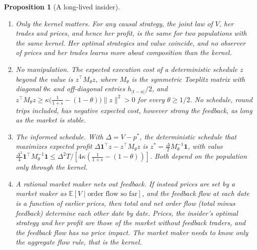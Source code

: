 \documentclass[12pt]{article}
\newtheorem{proposition}[theorem]{Proposition}
\theoremstyle{definition}
\theoremstyle{remark}
\begin{document}
\begin{proposition}[A long-lived insider]\label{prop:insider}
\begin{enumerate}[label=(\roman*),itemsep=1pt]
\item \emph{Only the kernel matters.} For any causal strategy, the joint law of $V$, her trades and prices, and hence her profit, is the same for two populations with the same kernel. Her optimal strategies and value coincide, and no observer of prices and her trades learns more about composition than the kernel.
\item \emph{No manipulation.} The expected execution cost of a deterministic schedule $z$ beyond the value is $z^\top M_\theta z$, where $M_\theta$ is the symmetric Toeplitz matrix with diagonal $\theta\kappa$ and off-diagonal entries $h_{|t-u|}/2$, and $z^\top M_\theta z\ge\kappa\bigl(\frac1{1+s}-(1-\theta)\bigr)\|z\|^2>0$ for every $\theta\ge1/2$. No schedule, round trips included, has negative expected cost, however strong the feedback, as long as the market is stable.
\item \emph{The informed schedule.} With $\Delta=V-p^*$, the deterministic schedule that maximizes expected profit $\Delta\mathbf 1^\top z-z^\top M_\theta z$ is $z^*=\frac\Delta2M_\theta^{-1}\mathbf 1$, with value $\frac{\Delta^2}4\mathbf 1^\top M_\theta^{-1}\mathbf 1\le\Delta^2T/[4\kappa(\frac1{1+s}-(1-\theta))]$. Both depend on the population only through the kernel.
\item \emph{A rational market maker nets out feedback.} If instead prices are set by a market maker as $\mathbb E[V\mid\text{order flow so far}]$, and the feedback flow at each date is a function of earlier prices, then total and net order flow (total minus feedback) determine each other date by date. Prices, the insider's optimal strategy and her profit are those of the market without feedback traders, and the feedback flow has no price impact. The market maker needs to know only the aggregate flow rule, that is the kernel.
\end{enumerate}
\end{proposition}
\end{document}
